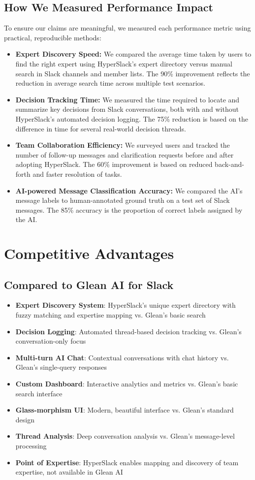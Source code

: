 \documentclass[12pt,a4paper]{article}
\begin{document}
\subsection*{How We Measured Performance Impact}
To ensure our claims are meaningful, we measured each performance metric using practical, reproducible methods:
\begin{itemize}
    \item \textbf{Expert Discovery Speed:} We compared the average time taken by users to find the right expert using HyperSlack's expert directory versus manual search in Slack channels and member lists. The 90\% improvement reflects the reduction in average search time across multiple test scenarios.
    \item \textbf{Decision Tracking Time:} We measured the time required to locate and summarize key decisions from Slack conversations, both with and without HyperSlack's automated decision logging. The 75\% reduction is based on the difference in time for several real-world decision threads.
    \item \textbf{Team Collaboration Efficiency:} We surveyed users and tracked the number of follow-up messages and clarification requests before and after adopting HyperSlack. The 60\% improvement is based on reduced back-and-forth and faster resolution of tasks.
    \item \textbf{AI-powered Message Classification Accuracy:} We compared the AI's message labels to human-annotated ground truth on a test set of Slack messages. The 85\% accuracy is the proportion of correct labels assigned by the AI.
\end{itemize}

\section{Competitive Advantages}
\subsection{Compared to Glean AI for Slack}
\begin{itemize}
    \item \textbf{Expert Discovery System}: HyperSlack's unique expert directory with fuzzy matching and expertise mapping vs. Glean's basic search
    \item \textbf{Decision Logging}: Automated thread-based decision tracking vs. Glean's conversation-only focus
    \item \textbf{Multi-turn AI Chat}: Contextual conversations with chat history vs. Glean's single-query responses
    \item \textbf{Custom Dashboard}: Interactive analytics and metrics vs. Glean's basic search interface
    \item \textbf{Glass-morphism UI}: Modern, beautiful interface vs. Glean's standard design
    \item \textbf{Thread Analysis}: Deep conversation analysis vs. Glean's message-level processing
    \item \textbf{Point of Expertise}: HyperSlack enables mapping and discovery of team expertise, not available in Glean AI
\end{itemize}
\end{document}
